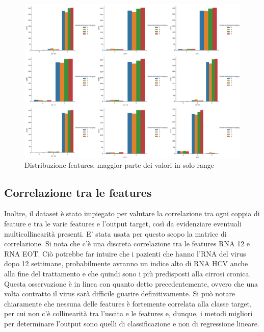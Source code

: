 \begin{figure}[H]
    \centering
    \includegraphics[width=1\columnwidth]{figures/plots_features.png}
    \caption{Distribuzione features, maggior parte dei valori in solo range}
    \label{fig:distr_features_2}
\end{figure}

\subsection{Correlazione tra le features}

Inoltre, il dataset è stato impiegato per valutare la correlazione tra ogni coppia di feature e tra le varie features e l'output target, così da evidenziare eventuali multicollinearità presenti. E' stata usata per questo scopo la matrice di correlazione. Si nota che c'è una discreta correlazione tra le features RNA 12 e RNA EOT. Ciò potrebbe far intuire che i pazienti che hanno l'RNA del virus dopo 12 settimane, probabilmente avranno un indice alto di RNA HCV anche alla fine del trattamento e che quindi sono i più predisposti alla cirrosi cronica. Questa osservazione è in linea con quanto detto precedentemente, ovvero che una volta contratto il virus sarà difficile guarire definitivamente.
Si può notare chiaramente che nessuna delle features è fortemente correlata alla classe target, per cui non c'è collinearità tra l'uscita e le features e, dunque, i metodi migliori per determinare l'output sono quelli di classificazione e non di regressione lineare.

